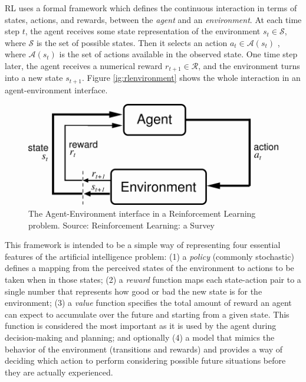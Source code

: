 RL uses a formal framework which defines the continuous interaction in terms of states, actions, and rewards, between the \textit{agent} and an \textit{environment}\cite{sutton1998reinforcement}. At each time step $t$, the agent receives some state representation of the environment $s_t \in \mathcal{S}$, where $\mathcal{S}$ is the set of possible states. Then it selects an action $a_t \in \mathcal{A}(s_t)$ , where $\mathcal{A}(s_t)$ is the set of actions available in the observed state. One time step later, the agent receives a numerical reward $r_{t+1} \in \mathcal{R}$, and the environment turns into a new state $s_{t+1}$. Figure \ref{ig:rlenvironment} shows the whole interaction in an agent-environment interface.

 \begin{figure}[h]
\centering
\includegraphics[scale=2]{images/rlenvironment}
\caption[Agent-Environment interface in a Reinforcement Learning problem]{The Agent-Environment interface in a Reinforcement Learning problem. Source: Reinforcement Learning: a Survey\cite{sutton1998reinforcement} }
\label{fig:rlenvironment}
\end{figure}

This framework is intended to be a simple way of representing four essential features of the artificial intelligence problem: (1) a \textit{policy} (commonly stochastic) defines a mapping from the perceived states of the environment to actions to be taken when in those states; (2) a \textit{reward} function maps each state-action pair to a single number that represents how good or bad the new state is for the environment; (3) a \textit{value} function specifies the total amount of reward an agent can expect to accumulate over the future and starting from a given state. This function is considered the most important as it is used by the agent during decision-making and planning; and optionally (4) a model that mimics the behavior of the environment (transitions and rewards) and provides a way of deciding which action to perform considering possible future situations before they are actually experienced.

